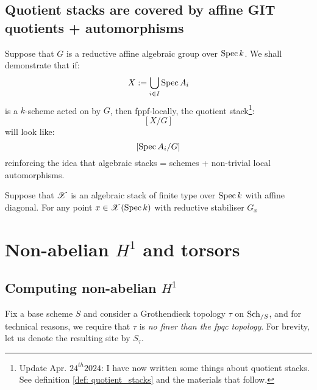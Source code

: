         \subsection{Quotient stacks are covered by affine GIT quotients + automorphisms}
            Suppose that $G$ is a reductive affine algebraic group over $\operatorname{Spec} k$. We shall demonstrate that if:
                $$X := \bigcup_{i \in I} \operatorname{Spec} A_i$$
            is a $k$-scheme acted on by $G$, then fppf-locally, the quotient stack\footnote{Update Apr. $24^{th} 2024$: I have now written some things about quotient stacks. See definition \ref{def: quotient_stacks} and the materials that follow.}:
                $$[X/G]$$
            will look like:
                $$[\operatorname{Spec} A_i/G]$$
            reinforcing the idea that algebraic stacks = schemes + non-trivial local automorphisms.

            \begin{theorem}
                Suppose that $\mathscr{X}$ is an algebraic stack of finite type over $\operatorname{Spec} k$ with affine diagonal. For any point $x \in \mathscr{X}(\operatorname{Spec} k)$ with reductive stabiliser $G_x$
            \end{theorem}

    \section{Non-abelian \texorpdfstring{$H^1$}{} and torsors}
        \subsection{Computing non-abelian \texorpdfstring{$H^1$}{}}
            \begin{convention}
                Fix a base scheme $S$ and consider a Grothendieck topology $\tau$ on $\mathrm{Sch}_{/S}$, and for technical reasons, we require that $\tau$ is \textit{no finer than the fpqc topology}. For brevity, let us denote the resulting site by $S_{\tau}$. 
            \end{convention}

